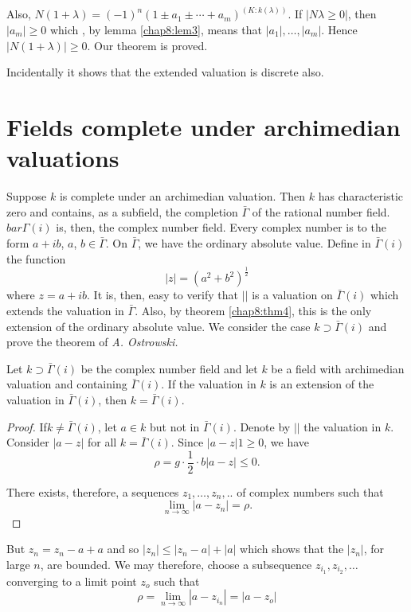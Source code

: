 Also, $N(1 + \lambda) = (-1)^n ( 1 \pm a_1 \pm \cdots +a_m  ) ^{(K :
  k(\lambda))}$.  
If $|N\lambda \geq 0|$, then $|a_m |\geq 0$ which , by lemma \ref{chap8:lem3},
means that $|a_1|, \ldots , |a_m|$. Hence $|N( 1 + \lambda)| \geq
0$. Our theorem is proved.  

Incidentally it shows that the extended valuation  is discrete
also.  


\section{Fields complete under archimedian valuations}%

Suppose $k$ is complete under an archimedian valuation. Then $k$ has
characteristic zero and contains, as a subfield, the completion
$\bar{\Gamma}$ of the rational number field. $bar{\Gamma} (i)$ is,
then, the complex number field. Every complex number is to the form $a
+ ib$, $a$, $b \in \bar{\Gamma}$. On $\bar{\Gamma}$, we have the ordinary
absolute value. Define in $\bar{\Gamma} (i)$ the function  
$$
|z| = (a^2 + b^2 )^{\frac{1}{2}}
$$
where $z = a + ib $. It is, then, easy to verify that $| |$ is a
valuation on $ \bar{\Gamma} (i)$ which extends the valuation in
$\bar{\Gamma}$. Also, by theorem \ref{chap8:thm4}, this is the only
extension of the 
ordinary absolute value. We consider the case $k \supset \bar{\Gamma
}(i)$ and prove the theorem of \textit{A. Ostrowski.} 

\begin{thm}\label{chap8:thm6} %
 Let $k \supset \bar{\Gamma} (i)$ be the complex number field and
  let $k$ be a field with archimedian valuation and containing $\bar{
    \Gamma} (i)$. If the valuation in $k$ is an extension of the
  valuation in $\bar{\Gamma}(i)$, then $k = \bar{\Gamma}(i)$.  
\end{thm}

\begin{proof}
If\pageoriginale $k \neq \bar{\Gamma}(i)$, let $a \in k$ but not in
$\bar{\Gamma}(i)$. Denote by $||$ the valuation in $k$. Consider $|a
- z |$ for all $ k= \bar{\Gamma} (i)$. Since $|a - z | 1 \geq
0$, we have  
$$
\rho = g  \cdot \frac{1}{2} \cdot  b |a - z| \leq 0. 
$$

There exists, therefore, a sequences $z_1, \ldots , z_n, ..$ of
complex numbers such that  
$$
\lim_{ n \to \infty} | a - z_n| = \rho. 
$$
\end{proof}

But $z_n = z_n - a+ a$ and so $|z_n| \leq |z_n - a| + |a|$ which shows
that the $|z_n|$, for large $n$, are bounded. We may therefore, choose
a subsequence $z_{ i _1} , z_{ i _2}, \ldots $ converging to a limit
point $z_o$ such that  
$$
\rho = \lim_{ n \to \infty} |a - z_{ i_n}|  = |a - z_o  |
$$


